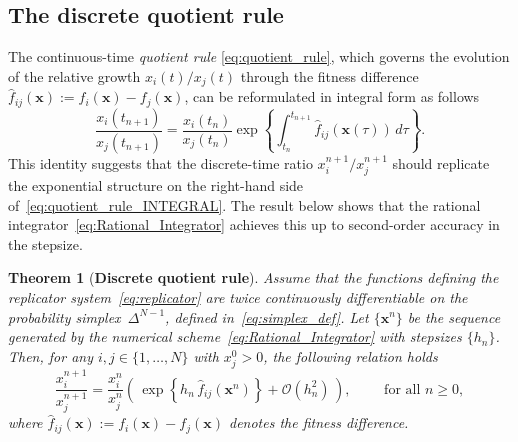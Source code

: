 \documentclass[11pt,letterpaper]{article}
\newtheorem{theorem}{Theorem}[section]
\theoremstyle{remark}
\begin{document}
\subsection{The discrete quotient rule}
The continuous-time \emph{quotient rule} \eqref{eq:quotient_rule}, which governs the evolution of the relative growth $x_i(t)/x_j(t)$ through the fitness difference $\hat{f}_{ij}(\bm{x}) := f_i(\bm{x}) - f_j(\bm{x})$, can be reformulated in integral form as follows
\begin{equation}\label{eq:quotient_rule_INTEGRAL}
    \frac{x_i(t_{n+1})}{x_j(t_{n+1})} = \frac{x_i(t_n)}{x_j(t_n)} \exp \left\{ \int_{t_n}^{t_{n+1}} \hat{f}_{ij}(\bm{x}(\tau)) \, d\tau \right\}.
\end{equation}
This identity suggests that the discrete-time ratio $x_i^{n+1}/x_j^{n+1}$ should replicate the exponential structure on the right-hand side of~\eqref{eq:quotient_rule_INTEGRAL}. The result below shows that the rational integrator~\eqref{eq:Rational_Integrator} achieves this up to second-order accuracy in the stepsize.
\begin{theorem}[\textbf{Discrete quotient rule}]\label{thm:Discrete_Quotient_Rule}
Assume that the functions defining the replicator system~\eqref{eq:replicator} are twice continuously differentiable on the probability simplex~$\Delta^{N-1}$, defined in~\eqref{eq:simplex_def}. Let $\{\bm{x}^n\}$ be the sequence generated by the numerical scheme~\eqref{eq:Rational_Integrator} with stepsizes $\{ h_n \}$. Then, for any $i,j \in \{1,\dots,N\}$ with $x_j^0 > 0$, the following relation holds 
\begin{equation}\label{eq:quotient_rule_Discrete}
    \frac{x_i^{n+1}}{x_j^{n+1}} = \frac{x_i^n}{x_j^n} \left( \, \exp\left\{ h_n \, \hat{f}_{ij}(\bm{x}^n) \right\} + \mathcal{O}(h_n^2) \, \right), \qquad \text{ for all } n\geq0,
\end{equation}
where $\hat{f}_{ij}(\bm{x}) := f_i(\bm{x}) - f_j(\bm{x})$ denotes the fitness difference.
\end{theorem}
\end{document}
